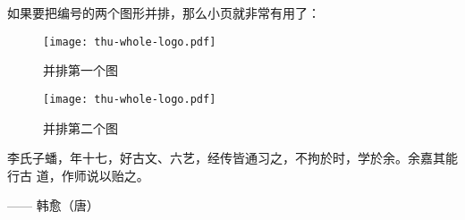 如果要把编号的两个图形并排，那么小页就非常有用了：
\begin{figure}
\begin{minipage}{0.48\textwidth}
  \centering
  \texttt{[image: thu-whole-logo.pdf]}
  \caption{并排第一个图}
  \label{fig:parallel1}
\end{minipage}\hfill
\begin{minipage}{0.48\textwidth}
  \centering
  \texttt{[image: thu-whole-logo.pdf]}
  \caption{并排第二个图}
  \label{fig:parallel2}
\end{minipage}
\end{figure}

李氏子蟠，年十七，好古文、六艺，经传皆通习之，不拘於时，学於余。余嘉其能行古
道，作师说以贻之。

\hfill —— 韩愈（唐）
